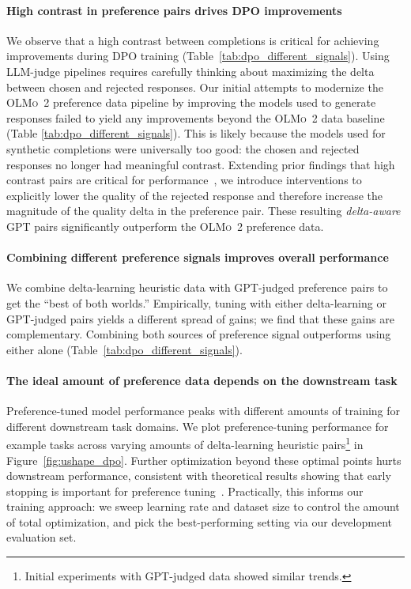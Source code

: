 \documentclass[table]{ai2style/ai2}
\newcommand{\oldOlmo}{OLMo\xspace}
\newcommand{\olmotoo}{\textsc{\oldOlmo~2}\xspace}
\begin{document}
{{\paragraph{High contrast in preference pairs drives DPO improvements} We observe that a high contrast between completions is critical for achieving improvements during DPO training (Table~\ref{tab:dpo_different_signals}). Using LLM-judge pipelines requires carefully thinking about maximizing the delta between chosen and rejected responses. Our initial attempts to modernize the \olmotoo preference data pipeline by improving the models used to generate responses failed to yield any improvements beyond the \olmotoo data baseline (Table \ref{tab:dpo_different_signals}). This is likely because the models used for synthetic completions were universally too good: the chosen and rejected responses no longer had meaningful contrast. Extending prior findings that high contrast pairs are critical for performance~\citep{geng2025delta, d2025anchored}, we introduce interventions to explicitly lower the quality of the rejected response and therefore increase the magnitude of the quality delta in the preference pair. These resulting \textit{delta-aware} GPT pairs significantly outperform the \olmotoo preference data.

\paragraph{Combining different preference signals improves overall performance} We combine delta-learning heuristic data with GPT-judged preference pairs to get the ``best of both worlds.'' Empirically, tuning with either delta-learning or GPT-judged pairs yields a different spread of gains; we find that these gains are complementary. Combining both sources of preference signal outperforms using either alone (Table~\ref{tab:dpo_different_signals}).

\paragraph{The ideal amount of preference data depends on the downstream task}
Preference-tuned model performance peaks with different amounts of training for different downstream task domains. We plot preference-tuning performance for example tasks across varying amounts of delta-learning heuristic pairs\footnote{Initial experiments with GPT-judged data showed similar trends.} in Figure~\ref{fig:ushape_dpo}. Further optimization beyond these optimal points hurts downstream performance, consistent with theoretical results showing that early stopping is important for preference tuning~\citep{azar2023generaltheoreticalparadigmunderstand, geng2025delta}. 
Practically, this informs our training approach: we sweep learning rate and dataset size to control the amount of total optimization, and pick the best-performing setting via our development evaluation set.

}}
\end{document}

